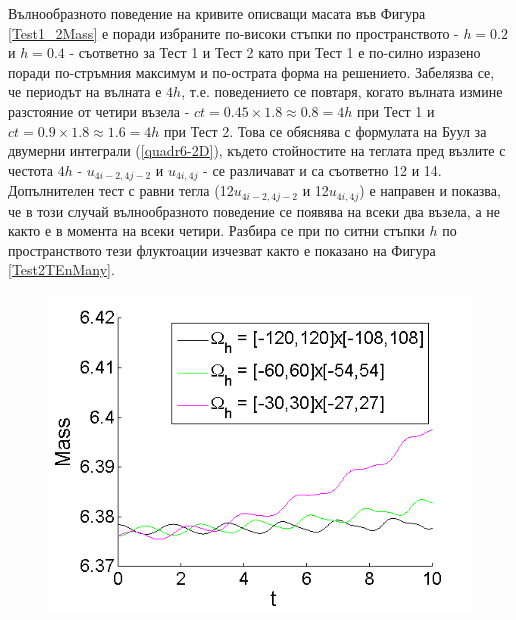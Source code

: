 \documentclass[a4paper]{article}
\newcommand{\rf}[1]{(\ref{#1})}
\theoremstyle{remark}
\begin{document}
\begin{large}
Вълнообразното поведение на кривите описващи масата във Фигура \ref{Test1_2Mass} е поради избраните по-високи стъпки по пространството - $h=0.2$ и $h=0.4$ - съответно за Тест 1 и Тест 2 като при Тест 1 е по-силно изразено поради по-стръмния максимум и по-острата форма на решението. Забелязва се, че периодът на вълната е $4h$, т.е. поведението се повтаря, когато вълната измине разстояние от четири възела - $ct = 0.45 \times 1.8 \approx 0.8 = 4h$ при Тест 1 и $ct = 0.9 \times 1.8 \approx 1.6 = 4h$ при Тест 2. Това се обяснява с формулата на Буул за двумерни интеграли \rf{quadr6-2D}, където стойностите на теглата пред възлите с честота $4h$ - $u_{4i-2,4j-2}$ и $u_{4i,4j}$ - се различават и са съответно 12 и 14. Допълнителен тест с равни тегла (12$u_{4i-2,4j-2}$ и 12$u_{4i,4j}$) е направен и показва, че в този случай вълнообразното поведение се появява на всеки два възела, а не както е в момента на всеки четири.  Разбира се при по ситни стъпки $h$ по пространството тези флуктоации изчезват както е показано на Фигура \ref{Test2TEnMany}.
\begin{figure}[ht]\vspace{0.2cm}
	\begin{minipage}[b]{0.51\linewidth}
		\includegraphics[width=\linewidth]{Mass/MassTaylor_120_60_30_ZB1_bt3_c045_h020_O(h^6).png}
	\end{minipage}	
	\begin{minipage}[b]{0.51\linewidth}

\end{minipage}
\end{figure}
\end{large}
\end{document}
